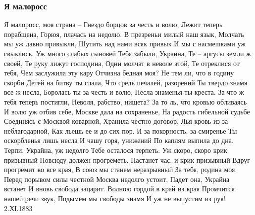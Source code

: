  
 
 

\subsubsection{Я малоросс}

Я малоросс, моя страна –
Гнездо борцов за честь и волю,
Лежит теперь порабщена,
Горюя, плачась на недолю.
В презреньи милый наш язык,
Молчать мы уж давно привыкли,
Шутить над нами всяк привык
И мы с насмешками уж свыклись.
Уж много слабых сыновей
Тебя забыли, Украина,
Те – аргусы земли ж своей,
Те руку лижут господина,
Одни молчат в неволе этой,
Те отреклися от тебя,
Чем заслужила эту кару
Отчизна бедная моя?
Не тем ли, что в годину скорби
Детей на битву ты слала,
Что средь печалей, разорений
Ты твердо знамя все ж несла,
Боролась ты за честь и волю,
Несла знаменья ты креста.
За что ж тебя теперь постигли,
Неволя, рабство, нищета?
За то ль, что кровью обливаясь
И волю уж отбив себе,
Москве дала на сохраненье,
На радость гибельной судьбе
Соединясь с Москвой коварной,
Хранила честно договор,
Лья кровь из-за неблагодарной,
Как льешь ее и до сих пор.
И за покорность, за смиренье
Ты оскорбленья лишь несла
И чашу горя, унижений
По каплям выпила до дна.
Терпи, Украйна, уж недолго
Тебе осталося терпеть.
Уж скоро, скоро крик призывный
Повсюду должен прогреметь.
Настанет час, и крик призывный
Вдруг прогремит во все края,
В союз мы станем неразрывный
За тебя, родина моя.
Перед порывом силы честной
Москва недолго устоит,
Падет она, Украйна встанет
И вновь свобода зацарит.
Волною гордой в край из края
Промчится нашей речи звук,
Подымем мы свободы знамя
И уж не выпустим из рук!
2.ХІ.1883 
